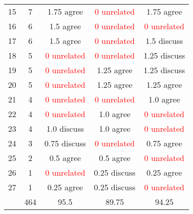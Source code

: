 \begin{center}
\begin{tabular}{ r | c || c c c }
  15                   & 7      & 1.75 agree                   & \textcolor{red}{0 unrelated} & 1.75 agree                   \\
  16                   & 6      & 1.5 agree                    & \textcolor{red}{0 unrelated} & \textcolor{red}{0 unrelated} \\
  17                   & 6      & 1.5 agree                    & \textcolor{red}{0 unrelated} & 1.5 discuss                  \\
  18                   & 5      & \textcolor{red}{0 unrelated} & \textcolor{red}{0 unrelated} & 1.25 discuss                 \\
  19                   & 5      & \textcolor{red}{0 unrelated} & 1.25 agree                   & 1.25 discuss                 \\
  20                   & 5      & \textcolor{red}{0 unrelated} & 1.25 agree                   & 1.25 agree                   \\
  21                   & 4      & \textcolor{red}{0 unrelated} & \textcolor{red}{0 unrelated} & 1.0 agree                    \\
  22                   & 4      & \textcolor{red}{0 unrelated} & 1.0 agree                    & \textcolor{red}{0 unrelated} \\
  23                   & 4      & 1.0 discuss                  & 1.0 agree                    & \textcolor{red}{0 unrelated} \\
  24                   & 3      & 0.75 discuss                 & \textcolor{red}{0 unrelated} & 0.75 agree                   \\
  25                   & 2      & 0.5 agree                    & 0.5 agree                    & \textcolor{red}{0 unrelated} \\
  26                   & 1      & \textcolor{red}{0 unrelated} & 0.25 discuss                 & 0.25 agree                   \\
  27                   & 1      & 0.25 agree                   & 0.25 discuss                 & \textcolor{red}{0 unrelated} \\ \hline
                       & 464    & 95.5                         & 89.75                        & 94.25                        \\
 \end{tabular}
\end{center}
